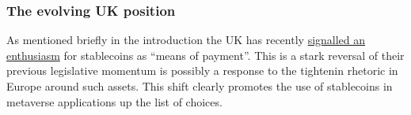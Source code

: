   




\subsubsection{The evolving UK position}
As mentioned briefly in the introduction the UK has recently \href{https://www.gov.uk/government/news/government-sets-out-plan-to-make-uk-a-global-cryptoasset-technology-hub}{signalled an enthusiasm} for stablecoins as ``means of payment''. This is a stark reversal of their previous legislative momentum is possibly a response to the tightenin rhetoric in Europe around such assets. This shift clearly promotes the use of stablecoins in metaverse applications up the list of choices. 



